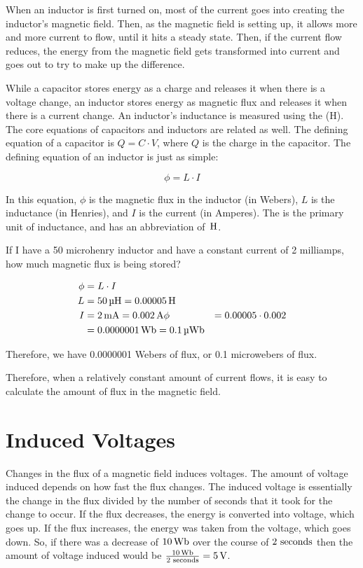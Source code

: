 When an inductor is first turned on, most of the current goes into creating the inductor's magnetic field.
Then, as the magnetic field is setting up, it allows more and more current to flow, until it hits a steady state.
Then, if the current flow reduces, the energy from the magnetic field gets transformed into current and goes out to try to make up the difference.

While a capacitor stores energy as a charge and releases it when there is a voltage change, an inductor stores energy as magnetic flux and releases it when there is a current change.
An inductor's inductance is measured using the  (H).
The core equations of capacitors and inductors are related as well.
The defining equation of a capacitor is $Q = C\cdot V$, where $Q$ is the charge in the capacitor.
The defining equation of an inductor is just as simple:

\begin{equation}
\label{eqinductance}
\phi = L\cdot I
\end{equation}

In this equation, $\phi$ is the magnetic flux in the inductor (in Webers), $L$ is the inductance (in Henries), and $I$ is the current (in Amperes).
The  is the primary unit of inductance, and has an abbreviation of $\myhy$.

\begin{exampleprob}
If I have a 50 microhenry inductor and have a constant current of 2 milliamps, how much magnetic flux is being stored?

\begin{align*}
\phi &= L\cdot I \\
L &= 50\myuhy = 0.00005\myhy \\
I &= 2\mymamp = 0.002\myamp
\phi &= 0.00005\cdot 0.002 \\
  &= 0.0000001\mywb = 0.1\myuwb
\end{align*}

Therefore, we have 0.0000001 Webers of flux, or 0.1 microwebers of flux.
\end{exampleprob}

Therefore, when a relatively constant amount of current flows, it is easy to calculate the amount of flux in the magnetic field.

\section{Induced Voltages}

Changes in the flux of a magnetic field induces voltages.
The amount of voltage induced depends on how fast the flux changes.
The induced voltage is essentially the change in the flux divided by the number of seconds that it took for the change to occur.
If the flux decreases, the energy is converted into voltage, which goes up.
If the flux increases, the energy was taken from the voltage, which goes down.
So, if there was a decrease of $10\mywb$ over the course of $2\textrm{ seconds}$ then the amount of voltage induced would be $\frac{10\mywb}{2\mysec} = 5\myvolt$.

